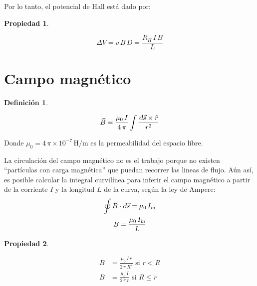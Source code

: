 \documentclass[a5paper,12pt,twoside]{book}
\newtheorem{defn}{{Definición}}[chapter]
\newtheorem{prop}{{Propiedad}}[chapter]
\begin{document}
Por lo tanto, el potencial de Hall está dado por:

\begin{mdframed}[style=MyFrame1]
    \begin{prop}
    \end{prop}
    \begin{equation*}
        \Delta V = v \, B \, D = \frac{R_H \, I \, B}{L}
    \end{equation*}
\end{mdframed}


\section{Campo magnético}

\begin{mdframed}[style=MyFrame1]
    \begin{defn}
    \end{defn}
    \begin{equation*}
        \Vec{B} = \frac{\mu_0 \, I}{4 \, \pi} \int \frac{\textsl{d} \Vec{s} \times \hat{r}}{r^2}
    \end{equation*}
\end{mdframed}

Donde $\mu_0 = 4 \, \pi \times 10^{-7} \, \si{\henry\per\metre}$ es la permeabilidad del espacio libre.

La circulación del campo magnético no es el trabajo porque no existen ``partículas con carga magnética'' que puedan recorrer las lineas de flujo. Aún así, es posible calcular la integral curvilínea para inferir el campo magnético a partir de la corriente $I$ y la longitud $L$ de la curva, según la ley de Ampere:
\begin{gather*}
    \oint \Vec{B} \cdot \textsl{d} \Vec{s} = \mu_0 \, {{I}_\textsl{{in}}}
    \\
    B = \frac{\mu_0 \, {{I}_\textsl{{in}}}}{L}
\end{gather*}

\begin{mdframed}[style=MyFrame1]
    \begin{prop}
    \end{prop}
    \begin{align*}
        B &= \frac{\mu_0 \, I \, r}{2 \, \pi \, R^2} \text{ si } r < R
        \\
        B &= \frac{\mu_0 \, I}{2 \, \pi \, r} \text{ si } R \leq r
    \end{align*}
\end{mdframed}
\end{document}
